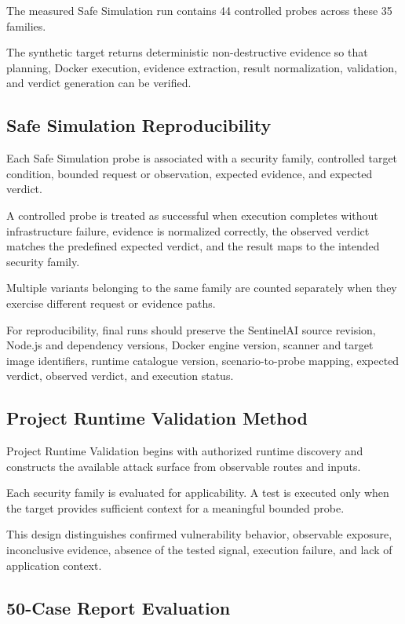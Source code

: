 \documentclass[journal]{IEEEtran}
\begin{document}
The measured Safe Simulation run contains 44 controlled probes across these
35 families.

The synthetic target returns deterministic non-destructive evidence so that
planning, Docker execution, evidence extraction, result normalization,
validation, and verdict generation can be verified.

\subsection{Safe Simulation Reproducibility}

Each Safe Simulation probe is associated with a security family, controlled
target condition, bounded request or observation, expected evidence, and
expected verdict.

A controlled probe is treated as successful when execution completes without
infrastructure failure, evidence is normalized correctly, the observed
verdict matches the predefined expected verdict, and the result maps to the
intended security family.

Multiple variants belonging to the same family are counted separately when
they exercise different request or evidence paths.

For reproducibility, final runs should preserve the SentinelAI source
revision, Node.js and dependency versions, Docker engine version, scanner
and target image identifiers, runtime catalogue version, scenario-to-probe
mapping, expected verdict, observed verdict, and execution status.

\subsection{Project Runtime Validation Method}

Project Runtime Validation begins with authorized runtime discovery and
constructs the available attack surface from observable routes and inputs.

Each security family is evaluated for applicability. A test is executed only
when the target provides sufficient context for a meaningful bounded probe.

This design distinguishes confirmed vulnerability behavior, observable
exposure, inconclusive evidence, absence of the tested signal, execution
failure, and lack of application context.

\subsection{50-Case Report Evaluation}
\end{document}
